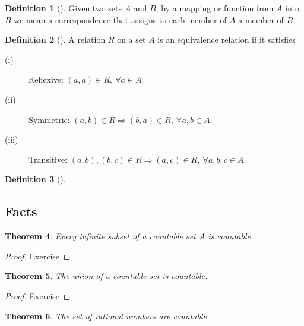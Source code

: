 \documentclass[	DIV=calc,paper=a4,fontsize=11pt]{scrartcl}	 	%
\newtheorem{thm}{Theorem}[section]
\theoremstyle{definition}
\newtheorem{defn}[thm]{Definition}
\theoremstyle{plain}
\theoremstyle{remark}
\begin{document}
\begin{defn}[\textbf{\color{blue}{Function}}]
Given two sets $A$ and $B$, by a mapping or function from $A$ into $B$ we mean a correspondence that assigns to each member of $A$ a member of $B$.
\end{defn}

\begin{defn}[\textbf{\color{blue}{Equivalence relation}}]
A relation $R$ on a set $A$ is an equivalence relation if it satisfies
\begin{description}
  \item[(i)] Reflexive: $(a,a)\in R,\ \forall a\in A$.
  \item[(ii)] Symmetric: $(a,b)\in R\Rightarrow (b,a)\in R,\ \forall a,b\in A$.
  \item[(iii)] Transitive: $(a,b),(b,c)\in R\Rightarrow (a,c)\in R,\ \forall a,b,c\in A$.
\end{description}
\end{defn}

\begin{defn}[\textbf{\color{blue}{Finite}}]

\end{defn}
\subsection{Facts}

\begin{thm}
Every infinite subset of a countable set $A$ is countable.
\end{thm}

\begin{proof}
Exercise
\end{proof}


\begin{thm}
The union of a countable set is countable.
\end{thm}

\begin{proof}
Exercise
\end{proof}

\newpage
\begin{thm}
The set of rational numbers are countable.
\end{thm}
\end{document}
